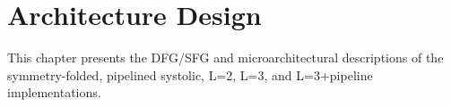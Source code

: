 \section{Architecture Design}

This chapter presents the DFG/SFG and microarchitectural descriptions of the symmetry-folded, pipelined systolic, L=2, L=3, and L=3+pipeline implementations.
